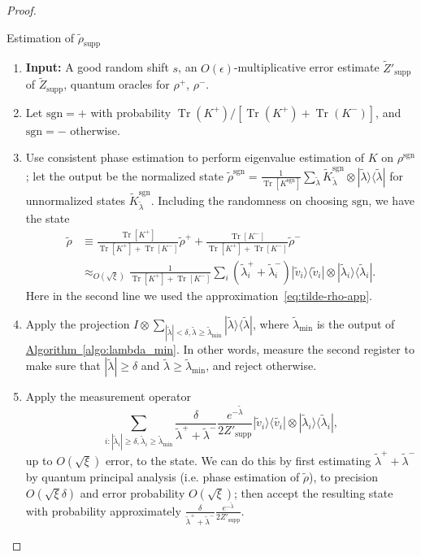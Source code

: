 \documentclass[a4paper,UKenglish,cleveref, autoref]{lipics-v2019}
\theoremstyle{remark}
\numberwithin{equation}{section}
\numberwithin{oracle}{section}
\numberwithin{remark}{section}
\newcommand{\algo}[1]{\hyperref[algo:#1]{Algorithm~\ref*{algo:#1}}}
\newcommand{\ket}[1]{|#1\rangle}
\newcommand{\bra}[1]{\langle#1|}
\DeclareMathOperator{\tr}{Tr}
\begin{document}
\begin{proof}
\begin{algorithm}[htbp]
\caption{Estimation of $\tilde{\rho}_{\text{supp}}$}
 \label{algo:tilderhosupp}
\begin{enumerate}
\item \textbf{Input:} A good random shift $s$, an $O(\epsilon)$-multiplicative error estimate $\widetilde{Z}'_{\text{supp}}$ of $\widetilde{Z}_{\text{supp}}$, quantum oracles for $\rho^+$, $\rho^-$.
\item Let $\text{sgn} = +$ with probability $\tr(K^+)/[\tr(K^+)+\tr(K^-)]$, and $\text{sgn} = -$ otherwise.
\item Use consistent phase estimation to perform eigenvalue estimation of $K$ on $\rho^{\text{sgn}}$; let the output be the normalized state $\tilde{\rho}^{\text{sgn}} = \frac{1}{\tr[K^{\text{sgn}}]}\sum_{\tilde{\lambda}} \widetilde{K}^{\text{sgn}}_{\tilde{\lambda}} \otimes \ket{\tilde{\lambda}}\bra{\tilde{\lambda}}$ for unnormalized states $\widetilde{K}^{\text{sgn}}_{\tilde{\lambda}}$. Including the randomness on choosing $\text{sgn}$, we have the state
\begin{align}
\tilde{\rho} &\equiv \frac{\tr[K^+]}{\tr[K^+]+\tr[K^-]}\tilde{\rho}^+ + \frac{\tr[K^-]}{\tr[K^+]+\tr[K^-]}\tilde{\rho}^- \\
&\approx_{O(\sqrt{\xi})} \frac{1}{\tr[K^+]+\tr[K^-]} \sum_i (\tilde{\lambda}^+_i + \tilde{\lambda}^-_i)\ket{\tilde{v}_i}\bra{\tilde{v}_i} \otimes \ket{\tilde{\lambda}_i}\bra{\tilde{\lambda}_i}.
\end{align}
Here in the second line we used the approximation~\eqref{eq:tilde-rho-app}.
\item Apply the projection $I \otimes \sum_{|\tilde{\lambda}| < \delta, \tilde{\lambda} \ge \tilde{\lambda}_{\text{min}}} \ket{\tilde{\lambda}}\bra{\tilde{\lambda}}$, where $\tilde{\lambda}_{\min}$ is the output of \algo{lambda_min}. In other words, measure the second register to make sure that $|\tilde{\lambda}| \ge \delta$ and $\tilde{\lambda} \ge \tilde{\lambda}_{\text{min}}$, and reject otherwise.
\item Apply the measurement operator
\begin{equation}
\sum_{i: |\tilde{\lambda}_i| \ge \delta, \tilde{\lambda}_i \ge \tilde{\lambda}_{\text{min}}} \frac{\delta}{\tilde{\lambda}^+ + \tilde{\lambda}^-}\frac{e^{-\tilde{\lambda}}}{2Z'_{\text{supp}}} \ket{\tilde{v}_i}\bra{\tilde{v_i}} \otimes \ket{\tilde{\lambda}_i}\bra{\tilde{\lambda}_i},
\end{equation}
up to $O(\sqrt{\xi})$ error, to the state. We can do this by first estimating $\tilde{\lambda}^+ + \tilde{\lambda}^-$ by quantum principal analysis (i.e. phase estimation of $\tilde{\rho}$), to precision $O(\sqrt{\xi}\delta)$ and error probability $O(\sqrt{\xi})$; then accept the resulting state with probability approximately $\frac{\delta}{\tilde{\lambda}^+ + \tilde{\lambda}^-}\frac{e^{-\tilde{\lambda}}}{2Z'_{\text{supp}}}$.

\end{enumerate}
\end{algorithm}
\end{proof}
\end{document}
